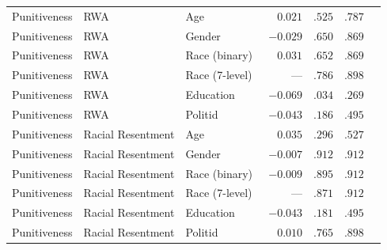 \begin{table}[!htbp]
\begin{tabular}{lllrrrl}
    \addlinespace
    Punitiveness & RWA                & Age            & $\phantom{-}0.021$ & $.525$  & $.787$  & \\
    Punitiveness & RWA                & Gender         & $-0.029$           & $.650$  & $.869$  & \\
    Punitiveness & RWA                & Race (binary)  & $\phantom{-}0.031$ & $.652$  & $.869$  & \\
    Punitiveness & RWA                & Race (7-level) & ---                & $.786$  & $.898$  & \\
    Punitiveness & RWA                & Education      & $-0.069$           & $.034$  & $.269$  & \\
    Punitiveness & RWA                & Politid        & $-0.043$           & $.186$  & $.495$  & \\
    \addlinespace
    Punitiveness & Racial Resentment  & Age            & $\phantom{-}0.035$ & $.296$  & $.527$  & \\
    Punitiveness & Racial Resentment  & Gender         & $-0.007$           & $.912$  & $.912$  & \\
    Punitiveness & Racial Resentment  & Race (binary)  & $-0.009$           & $.895$  & $.912$  & \\
    Punitiveness & Racial Resentment  & Race (7-level) & ---                & $.871$  & $.912$  & \\
    Punitiveness & Racial Resentment  & Education      & $-0.043$           & $.181$  & $.495$  & \\
    Punitiveness & Racial Resentment  & Politid        & $\phantom{-}0.010$ & $.765$  & $.898$  & \\
    \bottomrule
  \end{tabular}
\end{table}

